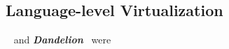\subsection{Language-level Virtualization}
~\cite{rossbach2011ptask}
and \textbf{\textit{Dandelion}}~\cite{dandelion} were


